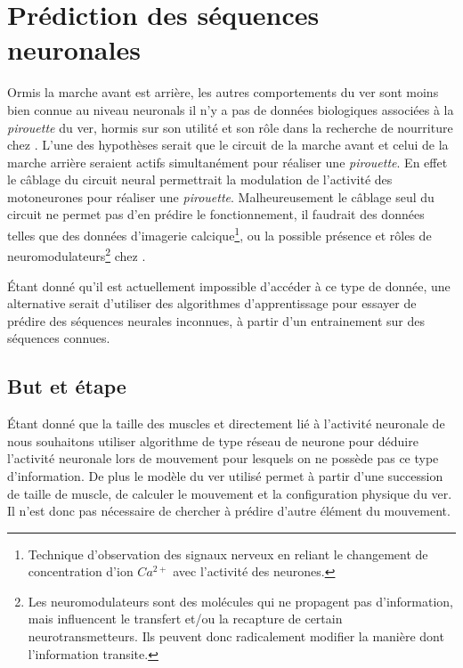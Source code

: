 \chapter{Prédiction des séquences neuronales} %
\label{cha:Prédire des séquences neuronales}

Ormis la marche avant est arrière, les autres comportements du ver sont moins bien
connue au niveau neuronals
il n'y a pas de données biologiques associées à la
\textit{pirouette} du ver, hormis sur son utilité et son rôle dans la recherche
de nourriture chez \celeg{}\cite{Gray2005}. L'une des hypothèses serait que le
circuit de la marche avant et celui de la marche arrière seraient actifs
simultanément pour réaliser une \textit{pirouette}. En effet le câblage du
circuit neural permettrait la modulation de l'activité des motoneurones pour
réaliser une \textit{pirouette}. Malheureusement le câblage seul du circuit ne
permet pas d'en prédire le fonctionnement, il faudrait des données telles que
des données d'imagerie calcique\footnote{Technique d'observation des signaux
nerveux en reliant le changement de concentration d'ion $Ca^{2+}$ avec
l'activité des neurones.}, ou la possible présence et rôles de
neuromodulateurs\footnote{Les neuromodulateurs sont des molécules qui ne
propagent pas d'information, mais influencent le transfert et/ou la recapture
de certain neurotransmetteurs. Ils peuvent donc radicalement modifier la
manière dont l'information transite.} chez \celeg{}.

Étant donné qu'il est actuellement impossible d'accéder à ce type de donnée, une
alternative serait d'utiliser des algorithmes d'apprentissage pour essayer de
prédire des séquences neurales inconnues, à partir d'un entrainement sur des
séquences connues.

\section{But et étape} %
\label{sec:But et étape}

Étant donné que la taille des muscles et directement lié à l'activité neuronale
de \celeg{} nous souhaitons utiliser algorithme de type réseau de neurone pour
déduire l'activité neuronale lors de mouvement pour lesquels on ne possède pas
ce type d'information. De plus le modèle du ver utilisé permet à partir d'une
succession de taille de muscle, de calculer le mouvement et la configuration
physique du ver. Il n'est donc pas nécessaire de chercher à prédire d'autre
élément du mouvement.

